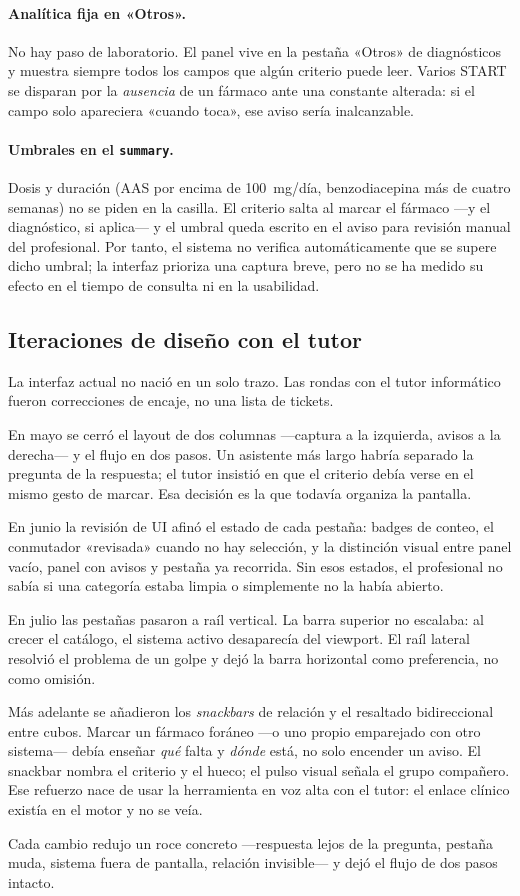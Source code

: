 \paragraph{Analítica fija en «Otros».}
No hay paso de laboratorio. El panel vive en la pestaña «Otros» de
diagnósticos y muestra siempre todos los campos que algún criterio
puede leer. Varios START se disparan por la \emph{ausencia} de un
fármaco ante una constante alterada: si el campo solo apareciera
«cuando toca», ese aviso sería inalcanzable.

\paragraph{Umbrales en el \texttt{summary}.}
Dosis y duración (AAS por encima de 100~mg/día, benzodiacepina más de
cuatro semanas) no se piden en la casilla. El criterio salta al
marcar el fármaco ---y el diagnóstico, si aplica--- y el umbral queda
escrito en el aviso para revisión manual del profesional. Por tanto,
el sistema no verifica automáticamente que se supere dicho umbral; la
interfaz prioriza una captura breve, pero no se ha medido su efecto en
el tiempo de consulta ni en la usabilidad.

\subsection{Iteraciones de diseño con el tutor}

La interfaz actual no nació en un solo trazo. Las rondas con el tutor
informático fueron correcciones de encaje, no una lista de tickets.

En mayo se cerró el layout de dos columnas ---captura a la izquierda,
avisos a la derecha--- y el flujo en dos pasos. Un asistente más
largo habría separado la pregunta de la respuesta; el tutor insistió
en que el criterio debía verse en el mismo gesto de marcar. Esa
decisión es la que todavía organiza la pantalla.

En junio la revisión de UI afinó el estado de cada pestaña: badges de
conteo, el conmutador «revisada» cuando no hay selección, y la
distinción visual entre panel vacío, panel con avisos y pestaña ya
recorrida. Sin esos estados, el profesional no sabía si una categoría
estaba limpia o simplemente no la había abierto.

En julio las pestañas pasaron a raíl vertical. La barra superior no
escalaba: al crecer el catálogo, el sistema activo desaparecía del
viewport. El raíl lateral resolvió el problema de un golpe y dejó la barra
horizontal como preferencia, no como omisión.

Más adelante se añadieron los \textit{snackbars} de relación y el
resaltado bidireccional entre cubos. Marcar un fármaco foráneo ---o
uno propio emparejado con otro sistema--- debía enseñar \emph{qué}
falta y \emph{dónde} está, no solo encender un aviso. El snackbar
nombra el criterio y el hueco; el pulso visual señala el grupo
compañero. Ese refuerzo nace de usar la herramienta en voz alta con
el tutor: el enlace clínico existía en el motor y no se veía.

Cada cambio redujo un roce concreto ---respuesta lejos de la
pregunta, pestaña muda, sistema fuera de pantalla, relación
invisible--- y dejó el flujo de dos pasos intacto.
